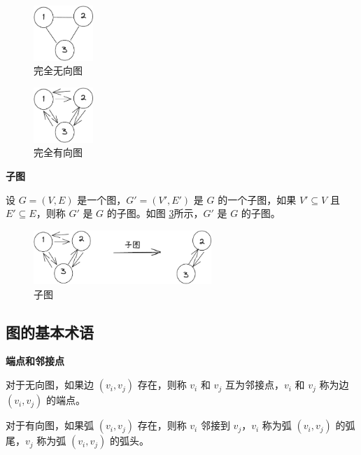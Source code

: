 \documentclass[lang=cn,newtx,10pt,scheme=chinese]{../elegantbook}
\begin{document}
\begin{figure}[!htbp]
  \centering
  \includegraphics[width=0.2\textwidth]{./figure/pdf/cropped/unDirection.pdf}
  \caption{完全无向图}
  \label{fig:completeGraph}

\end{figure}

\begin{figure}[!htbp]
  \centering
  \includegraphics[width=0.2\textwidth]{./figure/pdf/cropped/directedComGraph.pdf}
  \caption{完全有向图}
  \label{fig:completeDirectedGraph}
\end{figure}


\textbf{子图}

设 $G = (V, E)$ 是一个图，$G' = (V', E')$ 是 $G$ 的一个子图，如果 $V' \subseteq V$ 且 $E' \subseteq E$，则称 $G'$ 是 $G$ 的子图。如图 \ref{fig:subGraph}所示，$G'$ 是 $G$ 的子图。

\begin{figure}[!htbp]
  \centering
  \includegraphics[width=0.6\textwidth]{./figure/pdf/cropped/subGraph.pdf}
  \caption{子图}
  \label{fig:subGraph}
\end{figure}

      


\subsection{图的基本术语}


\textbf{端点和邻接点}

对于无向图，如果边 $(v_i, v_j)$ 存在，则称 $v_i$ 和 $v_j$ 互为邻接点，$v_i$ 和 $v_j$ 称为边 $(v_i, v_j)$ 的端点。

对于有向图，如果弧 $(v_i, v_j)$ 存在，则称 $v_i$ 邻接到 $v_j$，$v_i$ 称为弧 $(v_i, v_j)$ 的弧尾，$v_j$ 称为弧 $(v_i, v_j)$ 的弧头。
\end{document}
